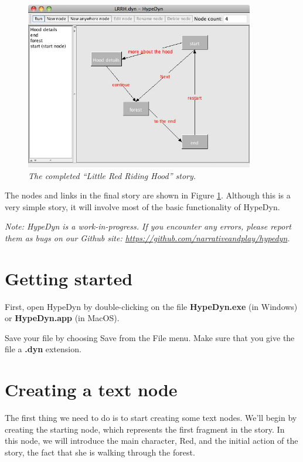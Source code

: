 \documentclass{article}
\begin{document}
\begin{figure}[ht]
  \centering
  \includegraphics[width=10cm]{images/hypedyn-tutorial-1-figure-1}
  \caption{\textit{The completed ``Little Red Riding Hood'' story.}}
  \label{fig:tut1:completed_story}
\end{figure} 

The nodes and links in the final story are shown in Figure
\ref{fig:tut1:completed_story}. Although this is a very simple story, it will involve
most of the basic functionality of HypeDyn.

\textit{Note:  HypeDyn is a work-in-progress. If you encounter any errors, please
report them as bugs on our Github site: \url{https://github.com/narrativeandplay/hypedyn}.}

\section{Getting started}

First, open HypeDyn by double-clicking on the file \textbf{HypeDyn.exe} (in
Windows) or \textbf{HypeDyn.app} (in MacOS).

Save your file by choosing Save from the File menu. Make sure that you give the
file a \textbf{.dyn} extension.

\section{Creating a text node}

The first thing we need to do is to start creating some text nodes. We'll begin
by creating the starting node, which represents the first fragment in the story.
In this node, we will introduce the main character, Red, and the initial action of
the story, the fact that she is walking through the forest.
 
\end{document}
